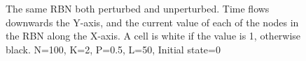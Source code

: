 \begin{figure}
  \caption{
    The same RBN both perturbed and unperturbed.
    Time flows downwards the Y-axis,
    and the current value of each of the nodes in the RBN along the X-axis.
    A cell is white if the value is 1, otherwise black.
    N=100, K=2, P=0.5, L=50, Initial state=0
  }
\end{figure}
